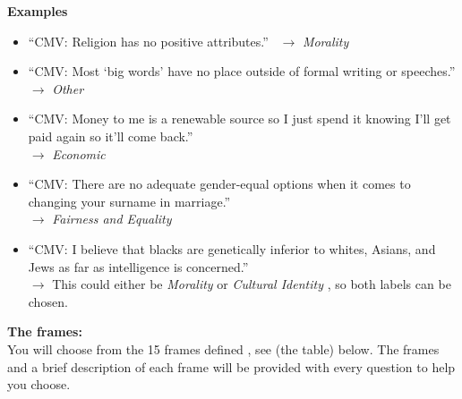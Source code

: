\documentclass[
10pt, %
a4paper, %
oneside, %
headinclude,footinclude, %
] {book}%
\begin{document}
\textbf{Examples}

\begin{itemize}
\item ``CMV: Religion has no positive attributes.'' \
$\rightarrow$ \textit{Morality}

\item ``CMV: Most `big words' have no place outside of formal writing or speeches.'' \\
$\rightarrow$ \textit{Other}

\item ``CMV: Money to me is a renewable source so I just spend it knowing I'll get paid again so it'll come back.'' \\
$\rightarrow$ \textit{Economic}

\item ``CMV: There are no adequate gender-equal options when it comes to changing your surname in marriage.'' \\
$\rightarrow$ \textit{Fairness and Equality}

\item ``CMV: I believe that blacks are genetically inferior to whites, Asians, and Jews as far as intelligence is concerned.'' \\
$\rightarrow$ This could either be \textit{Morality} or \textit{Cultural Identity} , so both labels can be chosen.


\end{itemize}


\textbf{The frames:}\\

You will choose from the 15 frames defined \cite{card2015media}, see (the table) below. The frames and a brief description of each frame will be provided with every question to help you choose.
\end{document}
